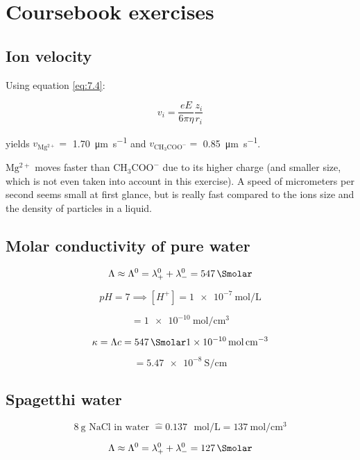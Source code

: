 \section{Coursebook exercises}

\subsection{Ion velocity}

Using equation \ref{eq:7.4}:

\begin{equation} \label{eq:7.4.ex}
    v_i = \frac{e E}{6 \pi \eta} \frac{z_i}{r_i}
\end{equation}

yields $v_{\mathrm{Mg^{2+}}} =$ \qty{1.70}{\micro\meter\per\second} and $v_{\mathrm{CH_3COO^{-}}} =$ \qty{0.85}{\micro\meter\per\second}.

$\mathrm{Mg^{2+}}$ moves faster than $\mathrm{CH_3COO^{-}}$ due to its higher charge (and smaller size, which is not even taken into account in this exercise). A speed of micrometers per second seems small at first glance, but is really fast compared to the ions size and the density of particles in a liquid.




\subsection{Molar conductivity of pure water}

$$\Lambda \approx \Lambda^0 = \lambda_+^0 + \lambda_-^0 = \qty{547}{\Smolar}$$

$$pH = 7 \implies [H^+] = \qty{1e-7}{\mole\per\liter}$$

$$= \qty{1e-10}{\mole\per\centi\meter\cubed}$$

$$\kappa = \Lambda c = \qty{547}{\Smolar}\qty{1e-10}{\mole\per\centi\meter\cubed}$$

$$= \qty{5.47e-8}{\siemens\per\centi\meter}$$



\subsection{Spagetthi water}

$$\qty{8}{\gram} \text{ NaCl in water } \widehat{=} 0.137 \text{ } \unit{\mole\per\liter} = \qty{137}{\mole\per\centi\meter\cubed}$$

$$\Lambda \approx \Lambda^0 = \lambda_+^0 + \lambda_-^0 = \qty{127}{\Smolar}$$

